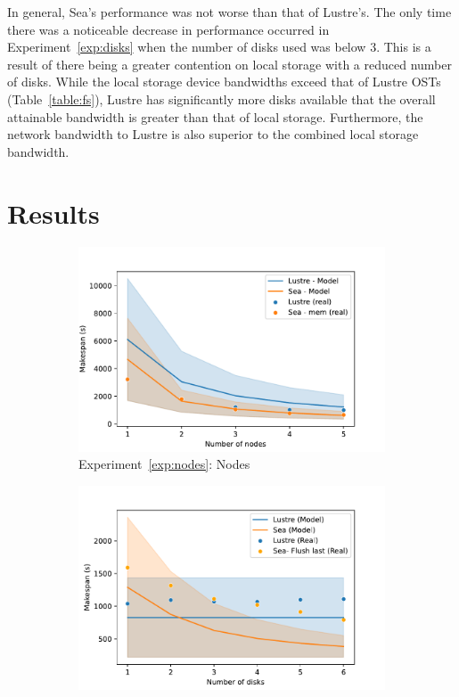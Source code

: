 \documentclass{report}
\begin{document}
    In general, Sea's performance was not worse than that of Lustre's. The only
    time there was a noticeable decrease in performance occurred in Experiment~\ref{exp:disks}
    when the number of disks used was below 3. This is a result of there being
    a greater contention on local storage with a reduced number of disks. While
    the local storage device bandwidths exceed that of Lustre OSTs (Table~\ref{table:fs}), Lustre has significantly more disks available that the overall
    attainable bandwidth is greater than that of local storage. Furthermore, 
    the network bandwidth to Lustre is also superior to the combined local
    storage bandwidth.
    \section{Results}\label{results}
    \begin{figure}
        \begin{subfigure}{0.5\textwidth}
            \centering
            \includegraphics[width=0.8\linewidth]{figures/nodes.pdf}
            \caption{Experiment~\ref{exp:nodes}: Nodes}
            \label{fig:nodes}
        \end{subfigure}%
        \begin{subfigure}{0.5\textwidth}
            \centering
            \includegraphics[width=0.8\linewidth]{figures/disks.pdf}

\end{subfigure}
\end{figure}
\end{document}
